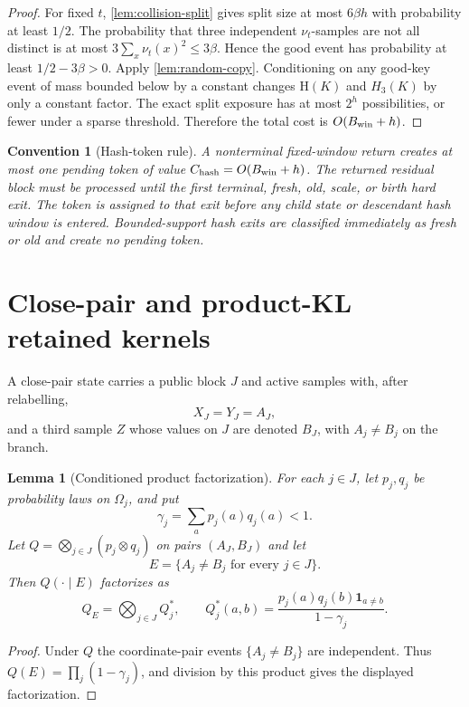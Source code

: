 \documentclass[11pt]{article}
\newcommand{\Cref}[1]{\ref{#1}}
\newtheorem{lemma}[theorem]{Lemma}
\newtheorem{convention}[theorem]{Convention}
\theoremstyle{remark}
\newcommand{\HH}{\mathrm H}
\begin{document}
\begin{proof}
For fixed $t$, \Cref{lem:collision-split} gives split size at most $6\beta h$ with probability at least $1/2$.  The probability that three independent $\nu_t$-samples are not all distinct is at most $3\sum_x\nu_t(x)^2\le3\beta$.  Hence the good event has probability at least $1/2-3\beta>0$.  Apply \Cref{lem:random-copy}.  Conditioning on any good-key event of mass bounded below by a constant changes $\HH(K)$ and $H_3(K)$ by only a constant factor.  The exact split exposure has at most $2^h$ possibilities, or fewer under a sparse threshold.  Therefore the total cost is $O(B_{\rm win}+h)$.
\end{proof}

\begin{convention}[Hash-token rule]\label{conv:hash-token}
A nonterminal fixed-window return creates at most one pending token of value $C_{\rm hash}=O(B_{\rm win}+h)$.  The returned residual block must be processed until the first terminal, fresh, old, scale, or birth hard exit.  The token is assigned to that exit before any child state or descendant hash window is entered.  Bounded-support hash exits are classified immediately as fresh or old and create no pending token.
\end{convention}


\section{Close-pair and product-KL retained kernels}\label{sec:close-pair}

A close-pair state carries a public block $J$ and active samples with, after relabelling,
\[
        X_J=Y_J=A_J,
\tag{*}
\]
and a third sample $Z$ whose values on $J$ are denoted $B_J$, with $A_j\ne B_j$ on the branch.

\begin{lemma}[Conditioned product factorization]\label{lem:conditioned-product}
For each $j\in J$, let $p_j,q_j$ be probability laws on $\Omega_j$, and put
\[
        \gamma_j=\sum_a p_j(a)q_j(a)<1.
\]
Let $Q=\bigotimes_{j\in J}(p_j\otimes q_j)$ on pairs $(A_J,B_J)$ and let
\[
        E=\{A_j\ne B_j\text{ for every }j\in J\}.
\]
Then $Q(\cdot\mid E)$ factorizes as
\[
        Q_E=\bigotimes_{j\in J} Q_j^*,
        \qquad
        Q_j^*(a,b)= \frac{p_j(a)q_j(b)\mathbf 1_{a\ne b}}{1-\gamma_j}.
\]
\end{lemma}

\begin{proof}
Under $Q$ the coordinate-pair events $\{A_j\ne B_j\}$ are independent.  Thus $Q(E)=\prod_j(1-\gamma_j)$, and division by this product gives the displayed factorization.
\end{proof}
\end{document}

